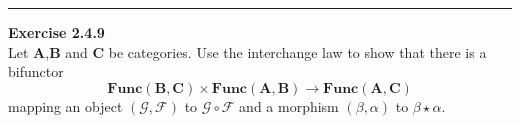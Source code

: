 \documentclass[a4paper, 12pt]{article}
\newenvironment{problem}[2][Exercise]
    { \begin{mdframed}[backgroundcolor=gray!20] \textbf{#1 #2} \\}
    {  \end{mdframed}}
\begin{document}
\noindent\rule{7in}{2.8pt}
\begin{problem}{2.4.9}
Let \(\mathbf{A}\),\(\mathbf{B}\) and \(\mathbf{C}\) be categories. Use the interchange law to show that there is a bifunctor 
$$\textbf{Func}(\mathbf{B},\mathbf{C})\times \textbf{Func}(\mathbf{A},\mathbf{B})\rightarrow \textbf{Func}(\mathbf{A},\mathbf{C})$$
mapping an object \((\mathcal{G},\mathcal{F})\) to \(\mathcal{G}\circ \mathcal{F}\) and a morphism \((\beta,\alpha)\) to \(\beta\star \alpha\).

\end{problem}
\end{document}

